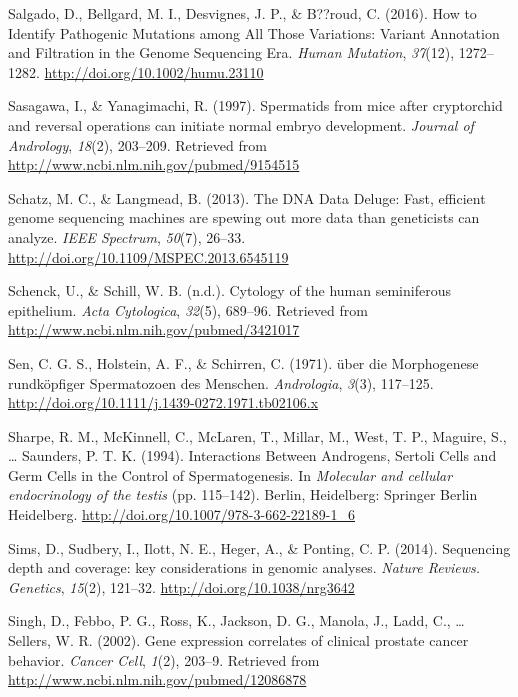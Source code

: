 \documentclass[12pt,twoside]{reedthesis}
\theoremstyle{definition}
\theoremstyle{definition}
\theoremstyle{remark}
\begin{document}
  \hypertarget{ref-Salgado2016}{}
  Salgado, D., Bellgard, M. I., Desvignes, J. P., \& B??roud, C. (2016).
  How to Identify Pathogenic Mutations among All Those Variations: Variant
  Annotation and Filtration in the Genome Sequencing Era. \emph{Human
  Mutation}, \emph{37}(12), 1272--1282.
  \url{http://doi.org/10.1002/humu.23110}
  
  \hypertarget{ref-Sasagawa}{}
  Sasagawa, I., \& Yanagimachi, R. (1997). Spermatids from mice after
  cryptorchid and reversal operations can initiate normal embryo
  development. \emph{Journal of Andrology}, \emph{18}(2), 203--209.
  Retrieved from \url{http://www.ncbi.nlm.nih.gov/pubmed/9154515}
  
  \hypertarget{ref-Schatz2013}{}
  Schatz, M. C., \& Langmead, B. (2013). The DNA Data Deluge: Fast,
  efficient genome sequencing machines are spewing out more data than
  geneticists can analyze. \emph{IEEE Spectrum}, \emph{50}(7), 26--33.
  \url{http://doi.org/10.1109/MSPEC.2013.6545119}
  
  \hypertarget{ref-Schenck}{}
  Schenck, U., \& Schill, W. B. (n.d.). Cytology of the human seminiferous
  epithelium. \emph{Acta Cytologica}, \emph{32}(5), 689--96. Retrieved
  from \url{http://www.ncbi.nlm.nih.gov/pubmed/3421017}
  
  \hypertarget{ref-Sen2009}{}
  Sen, C. G. S., Holstein, A. F., \& Schirren, C. (1971). über die
  Morphogenese rundköpfiger Spermatozoen des Menschen. \emph{Andrologia},
  \emph{3}(3), 117--125.
  \url{http://doi.org/10.1111/j.1439-0272.1971.tb02106.x}
  
  \hypertarget{ref-Sharpe1994}{}
  Sharpe, R. M., McKinnell, C., McLaren, T., Millar, M., West, T. P.,
  Maguire, S., \ldots{} Saunders, P. T. K. (1994). Interactions Between
  Androgens, Sertoli Cells and Germ Cells in the Control of
  Spermatogenesis. In \emph{Molecular and cellular endocrinology of the
  testis} (pp. 115--142). Berlin, Heidelberg: Springer Berlin Heidelberg.
  \url{http://doi.org/10.1007/978-3-662-22189-1_6}
  
  \hypertarget{ref-Sims2014}{}
  Sims, D., Sudbery, I., Ilott, N. E., Heger, A., \& Ponting, C. P.
  (2014). Sequencing depth and coverage: key considerations in genomic
  analyses. \emph{Nature Reviews. Genetics}, \emph{15}(2), 121--32.
  \url{http://doi.org/10.1038/nrg3642}
  
  \hypertarget{ref-Singh2002}{}
  Singh, D., Febbo, P. G., Ross, K., Jackson, D. G., Manola, J., Ladd, C.,
  \ldots{} Sellers, W. R. (2002). Gene expression correlates of clinical
  prostate cancer behavior. \emph{Cancer Cell}, \emph{1}(2), 203--9.
  Retrieved from \url{http://www.ncbi.nlm.nih.gov/pubmed/12086878}
  
\end{document}
